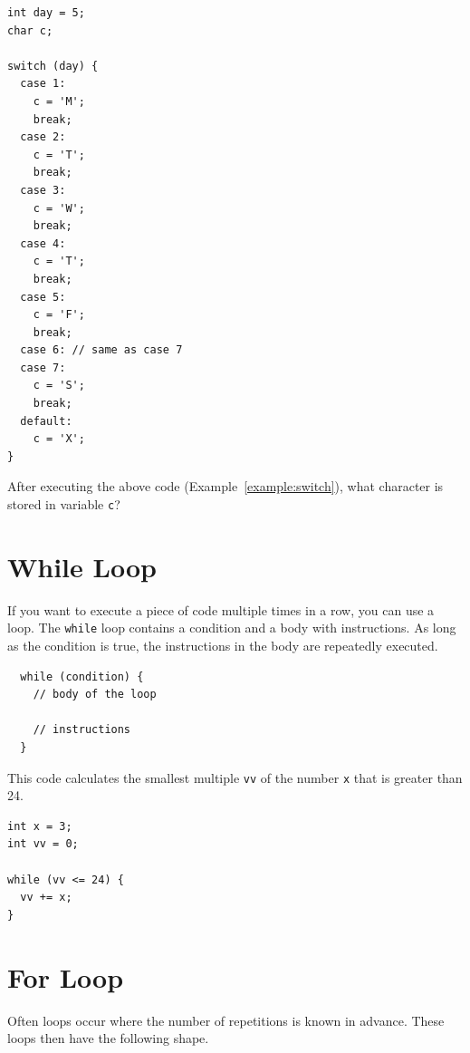 \documentclass[11pt,fleqn]{book} %
\begin{document}
\begin{example}
	\label{example:switch}
	\phantom{ }
	\begin{verbatim}
int day = 5;
char c;

switch (day) {
  case 1:
    c = 'M';
    break;
  case 2:
    c = 'T';
    break;
  case 3:
    c = 'W';
    break;
  case 4:
    c = 'T';
    break;
  case 5:
    c = 'F';
    break;
  case 6: // same as case 7
  case 7:
    c = 'S';
    break;
  default:
    c = 'X';
}
	\end{verbatim}
\end{example}

\begin{exercise}
    After executing the above code (Example~\ref{example:switch}), what character is stored in variable \texttt{c}?
\end{exercise}

\section{While Loop}
If you want to execute a piece of code multiple times in a row, you can use a loop. The \texttt{while} loop contains a condition and a body with instructions. As long as the condition is true, the instructions in the body are repeatedly executed.

\begin{definition}[While]
	\phantom{ }
	\begin{verbatim}
  while (condition) {
    // body of the loop

    // instructions
  }
	\end{verbatim}
	\vspace{0cm}
\end{definition}

\begin{example}[While]
    This code calculates the smallest multiple \texttt{vv} of the number \texttt{x} that is greater than 24.
	\begin{verbatim}
int x = 3;
int vv = 0;

while (vv <= 24) {
  vv += x;
}
	\end{verbatim}
\end{example}

\section{For Loop}
Often loops occur where the number of repetitions is known in advance. These loops then have the following shape.
\end{document}
